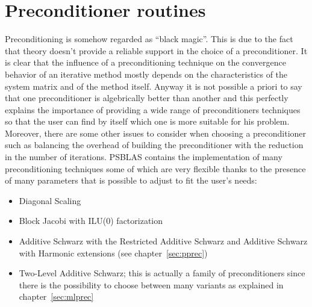 \section{Preconditioner routines}
\label{sec:precs}

\label{sec:psprecs}
Preconditioning is somehow regarded as ``black magic''. This is due to
the fact that theory doesn't provide a reliable support in the choice
of a preconditioner. It is clear that the influence of a
preconditioning technique on the convergence behavior of an iterative
method mostly depends on the characteristics of the system matrix and
of the method itself. Anyway it is not possible a priori to say that
one preconditioner is algebrically better than another and this perfectly explains
the importance of providing a wide range of preconditioners techniques
so that the user can find by itself which one is more suitable for his
problem. Moreover, there are some other issues to consider when
choosing a preconditioner such as balancing the overhead of building
the preconditioner with the reduction in the number of
iterations. PSBLAS contains the implementation of many preconditioning
techniques some of which are very flexible thanks to the presence of
many parameters that is possible to adjust to fit the user's needs:
\begin{itemize}
\item Diagonal Scaling
\item Block Jacobi with ILU(0) factorization
\item Additive Schwarz with the Restricted Additive Schwarz and
  Additive Schwarz with Harmonic extensions (see
  chapter~\ref{sec:pprec})
\item Two-Level Additive Schwarz; this is actually a family of
  preconditioners since there is the possibility to choose between
  many variants as explained in chapter~\ref{sec:mlprec}
\end{itemize}





